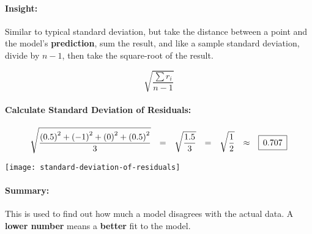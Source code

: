 \documentclass[12pt]{article}
\newcommand{\paddedBox}[1]{{\setlength\fboxsep{5pt}\boxed{#1}}}
\begin{document}
\paragraph{Insight:}
Similar to typical standard deviation, but take the distance between a point and the model's \textbf{prediction}, sum the result, and like a sample standard deviation, divide by $n - 1$, then take the square-root of the result.

\begin{equation}
	\sqrt{\frac{\sum r_{i}}{n -1}}
\end{equation}


\paragraph{Calculate Standard Deviation of Residuals:}
\begin{align*}
	\sqrt{\frac{{(0.5)}^{2} + {(-1)}^{2} + {(0)}^{2} + {(0.5)}^{2}}{3}} && = &&
	\sqrt{\frac{1.5}{3}} && = &&
	\sqrt{\frac{1}{2}} && \approx &&
	\paddedBox{0.707}
\end{align*}

\begin{center}
	\texttt{[image: standard-deviation-of-residuals]}
\end{center}

\paragraph{Summary:}
This is used to find out how much a model disagrees with the actual data. A \textbf{lower number} means a \textbf{better} fit to the model.

\end{document}
